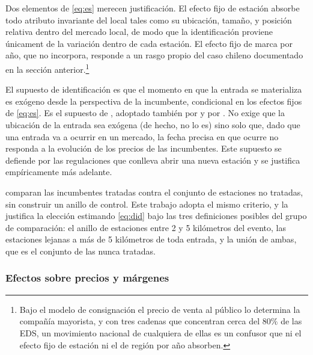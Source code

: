 Dos elementos de \eqref{eq:es} merecen justificación. El efecto fijo de estación absorbe todo atributo invariante del local tales como su ubicación, tamaño, y posición relativa dentro del mercado local, de modo que la identificación proviene únicament  de la variación dentro de cada estación. El efecto fijo de marca por año, que \textcite{FISCHER2025} no incorpora, responde a un rasgo propio del caso
chileno documentado en la sección anterior.\footnote{Bajo el modelo de consignación el precio de venta al público lo determina la compañía mayorista, y con tres cadenas que concentran cerca del $80\%$ de las EDS, un movimiento nacional de cualquiera de ellas es un confusor que ni el efecto fijo de estación ni el de región por año absorben.}

El supuesto de identificación es que el momento en que la entrada se materializa es exógeno desde la perspectiva de la incumbente, condicional en los efectos fijos de \eqref{eq:es}. Es el supuesto de \textcite{ARCIDIACONO2020}, adoptado también por \textcite{FISCHER2025} y por \textcite{KOH2022}. No exige que la ubicación de la entrada sea exógena (de hecho, no lo es) sino solo que, dado que una entrada va a ocurrir en un mercado, la fecha precisa  en que ocurre no responda a la evolución de los precios de las incumbentes. Este supuesto se defiende por las regulaciones que conlleva abrir una nueva estación y se justifica empíricamente más adelante.

\textcite{FISCHER2025} comparan las incumbentes tratadas contra el conjunto de estaciones no tratadas, sin construir un anillo de control. Este trabajo adopta el mismo criterio, y la  justifica la elección estimando \eqref{eq:did} bajo las tres definiciones posibles del grupo de comparación: el anillo de estaciones entre 2 y 5 kilómetros del evento, las estaciones lejanas a más de 5 kilómetros de toda entrada, y la unión de ambas, que es el conjunto de las nunca tratadas.

\subsubsection{Efectos sobre precios y márgenes}

\begin{table}[H]
\centering
\caption{Efecto de la entrada sobre el precio, según el grupo de comparación}
\label{tab:control}
\end{table}

